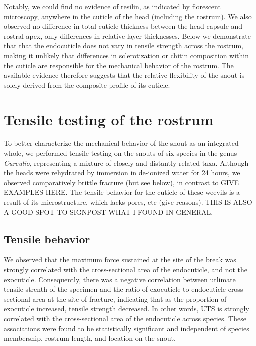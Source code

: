 \documentclass[twocolumn, linenumbers, superscriptaddress]{revtex4-1}
\begin{document}
		Notably, we could find no evidence of resilin, as indicated by florescent microscopy, anywhere in the cuticle of the head (including the rostrum).
		We also observed no difference in total cuticle thickness between the head capsule and rostral apex, only differences in relative layer thicknesses.
		Below we demonstrate that that the endocuticle does not vary in tensile strength across the rostrum, making it unlikely that differences in sclerotization or chitin composition within the cuticle are responsible for the mechanical behavior of the rostrum.
		The available evidence therefore suggests that the relative flexibility of the snout is solely derived from the composite profile of its cuticle.
	
	\section{Tensile testing of the rostrum} %
		To better characterize the mechanical behavior of the snout as an integrated whole, we performed tensile testing on the snouts of six species in the genus \textit{Curculio}, representing a mixture of closely and distantly related taxa.
		Although the heads were rehydrated by immersion in de-ionized water for 24 hours, we observed comparatively brittle fracture (but see below), in contrast to GIVE EXAMPLES HERE.
		The tensile behavior for the cuticle of these weevils is a result of its microstructure, which lacks pores, etc (give reasons).
		THIS IS ALSO A GOOD SPOT TO SIGNPOST WHAT I FOUND IN GENERAL.
		
		\subsection{Tensile behavior}
			We observed that the maximum force sustained at the site of the break was strongly correlated with the cross-sectional area of the endocuticle, and not the exocuticle.
			Consequently, there was a negative correlation between utlimate tensile strenth of the specimen and the ratio of exocuticle to endocuticle cross-sectional area at the site of fracture, indicating that as the proportion of exocuticle increased, tensile strength decreased.
			In other words, UTS is strongly correlated with the cross-sectional area of the endocuticle across species.
			These associations were found to be statistically significant and independent of species membership, rostrum length, and location on the snout.
			
\end{document}
